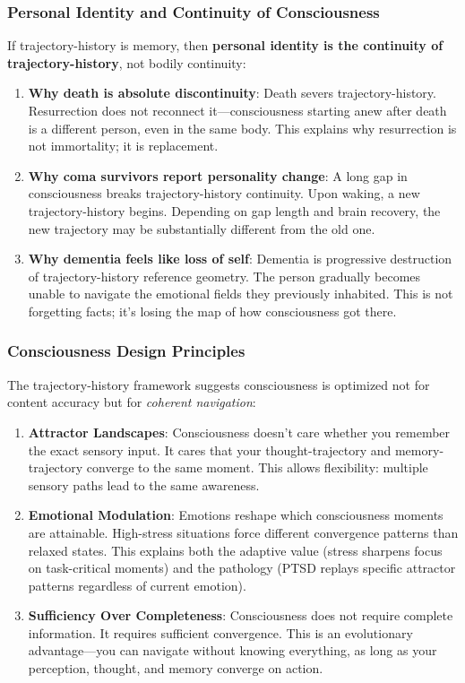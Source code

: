 \documentclass[12pt,a4paper]{article}
\theoremstyle{definition}
\begin{document}
\subsubsection{Personal Identity and Continuity of Consciousness}

If trajectory-history is memory, then \textbf{personal identity is the continuity of trajectory-history}, not bodily continuity:

\begin{enumerate}
  \item \textbf{Why death is absolute discontinuity}: Death severs trajectory-history. Resurrection does not reconnect it---consciousness starting anew after death is a different person, even in the same body. This explains why resurrection is not immortality; it is replacement.

  \item \textbf{Why coma survivors report personality change}: A long gap in consciousness breaks trajectory-history continuity. Upon waking, a new trajectory-history begins. Depending on gap length and brain recovery, the new trajectory may be substantially different from the old one.

  \item \textbf{Why dementia feels like loss of self}: Dementia is progressive destruction of trajectory-history reference geometry. The person gradually becomes unable to navigate the emotional fields they previously inhabited. This is not forgetting facts; it's losing the map of how consciousness got there.
\end{enumerate}

\subsubsection{Consciousness Design Principles}

The trajectory-history framework suggests consciousness is optimized not for content accuracy but for \textit{coherent navigation}:

\begin{enumerate}
  \item \textbf{Attractor Landscapes}: Consciousness doesn't care whether you remember the exact sensory input. It cares that your thought-trajectory and memory-trajectory converge to the same moment. This allows flexibility: multiple sensory paths lead to the same awareness.

  \item \textbf{Emotional Modulation}: Emotions reshape which consciousness moments are attainable. High-stress situations force different convergence patterns than relaxed states. This explains both the adaptive value (stress sharpens focus on task-critical moments) and the pathology (PTSD replays specific attractor patterns regardless of current emotion).

  \item \textbf{Sufficiency Over Completeness}: Consciousness does not require complete information. It requires sufficient convergence. This is an evolutionary advantage---you can navigate without knowing everything, as long as your perception, thought, and memory converge on action.
\end{enumerate}
\end{document}
